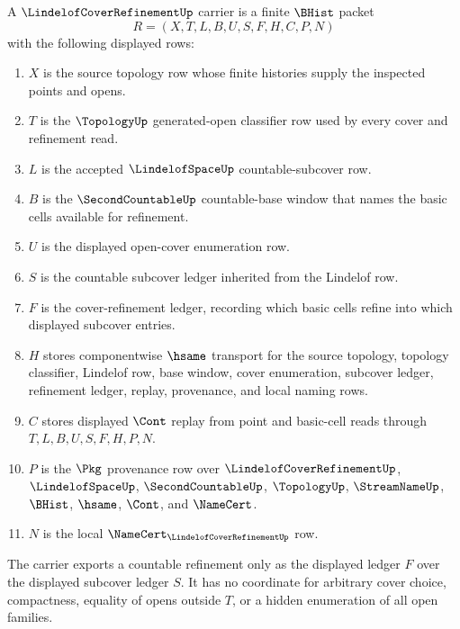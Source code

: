 \begin{definition}
\label{def:lindelof-cover-refinement-carrier}
A $\LindelofCoverRefinementUp$ carrier is a finite $\BHist$ packet
$$
R=(X,T,L,B,U,S,F,H,C,P,N)
$$
with the following displayed rows:
\begin{enumerate}
\item $X$ is the source topology row whose finite histories supply the inspected points and opens.
\item $T$ is the $\TopologyUp$ generated-open classifier row used by every cover and refinement read.
\item $L$ is the accepted $\LindelofSpaceUp$ countable-subcover row.
\item $B$ is the $\SecondCountableUp$ countable-base window that names the basic cells available for refinement.
\item $U$ is the displayed open-cover enumeration row.
\item $S$ is the countable subcover ledger inherited from the Lindelof row.
\item $F$ is the cover-refinement ledger, recording which basic cells refine into which displayed subcover entries.
\item $H$ stores componentwise $\hsame$ transport for the source topology, topology classifier, Lindelof row, base window, cover enumeration, subcover ledger, refinement ledger, replay, provenance, and local naming rows.
\item $C$ stores displayed $\Cont$ replay from point and basic-cell reads through $T,L,B,U,S,F,H,P,N$.
\item $P$ is the $\Pkg$ provenance row over $\LindelofCoverRefinementUp$, $\LindelofSpaceUp$, $\SecondCountableUp$, $\TopologyUp$, $\StreamNameUp$, $\BHist$, $\hsame$, $\Cont$, and $\NameCert$.
\item $N$ is the local $\NameCert_{\LindelofCoverRefinementUp}$ row.
\end{enumerate}
The carrier exports a countable refinement only as the displayed ledger $F$ over the displayed subcover ledger $S$. It has no coordinate for arbitrary cover choice, compactness, equality of opens outside $T$, or a hidden enumeration of all open families.
\end{definition}

